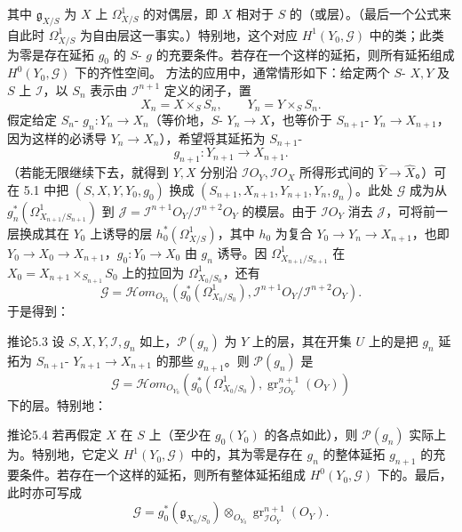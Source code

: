 其中 $\mathfrak g_{X/S}$ 为 $X$ 上 $\Omega^1_{X/S}$ 的对偶层，即 $X$ 相对于 $S$ 的（或层）。（最后一个公式来自此时 $\Omega^1_{X/S}$ 为自由层这一事实。）特别地，这个对应 $H^1(Y_0,\mathcal G)$ 中的类；此类为零是存在延拓 $g_0$ 的 $S$- $g$ 的充要条件。若存在一个这样的延拓，则所有延拓组成 $H^0(Y_0,\mathcal G)$ 下的齐性空间。
方法的应用中，通常情形如下：给定两个 $S$- $X,Y$ 及 $S$ 上 $\mathcal I$，以 $S_n$ 表示由 $\mathcal I^{n+1}$ 定义的闭子，置
\[X_n=X\times_S S_n,\qquad Y_n=Y\times_S S_n.\]
假定给定 $S_n$- $g_n:Y_n\to X_n$（等价地，$S$- $Y_n\to X$，也等价于 $S_{n+1}$- $Y_n\to X_{n+1}$，因为这样的必诱导 $Y_n\to X_n$），希望将其延拓为 $S_{n+1}$-
\[g_{n+1}:Y_{n+1}\to X_{n+1}.\]
（若能无限继续下去，就得到 $Y,X$ 分别沿 $\mathcal I O_Y,\mathcal I O_X$ 所得形式间的 $\widehat Y\to\widehat X$。）可在 5.1 中把 $(S,X,Y,Y_0,g_0)$ 换成 $(S_{n+1},X_{n+1},Y_{n+1},Y_n,g_n)$。此处 $\mathcal G$ 成为从 $g_n^*(\Omega^1_{X_{n+1}/S_{n+1}})$ 到 $\mathcal J=\mathcal I^{n+1}O_Y/\mathcal I^{n+2}O_Y$ 的模层。由于 $\mathcal I O_Y$ 消去 $\mathcal J$，可将前一层换成其在 $Y_0$ 上诱导的层 $h_0^*(\Omega^1_{X/S})$，其中 $h_0$ 为复合 $Y_0\to Y_n\to X_{n+1}$，也即 $Y_0\to X_0\to X_{n+1}$，$g_0:Y_0\to X_0$ 由 $g_n$ 诱导。因 $\Omega^1_{X_{n+1}/S_{n+1}}$ 在 $X_0=X_{n+1}\times_{S_{n+1}}S_0$ 上的拉回为 $\Omega^1_{X_0/S_0}$，还有
\[\mathcal G=\mathcal H\!om_{O_{Y_0}}(g_0^*(\Omega^1_{X_0/S_0}),\mathcal I^{n+1}O_Y/\mathcal I^{n+2}O_Y).\]
于是得到：
\begin{SGAresult}{推论}{5.3}
设 $S,X,Y,\mathcal I,g_n$ 如上，$\mathcal P(g_n)$ 为 $Y$ 上的层，其在开集 $U$ 上的是把 $g_n$ 延拓为 $S_{n+1}$- $Y_{n+1}\to X_{n+1}$ 的那些 $g_{n+1}$。则 $\mathcal P(g_n)$ 是
\[\mathcal G=\mathcal H\!om_{O_{Y_0}}(g_0^*(\Omega^1_{X_0/S_0}),\operatorname{gr}^{n+1}_{\mathcal I O_Y}(O_Y))\]
下的层。特别地：
\end{SGAresult}
\begin{SGAresult}{推论}{5.4}
若再假定 $X$ 在 $S$ 上（至少在 $g_0(Y_0)$ 的各点如此），则 $\mathcal P(g_n)$ 实际上为。特别地，它定义 $H^1(Y_0,\mathcal G)$ 中的，其为零是存在 $g_n$ 的整体延拓 $g_{n+1}$ 的充要条件。若存在一个这样的延拓，则所有整体延拓组成 $H^0(Y_0,\mathcal G)$ 下的。最后，此时亦可写成
\[\mathcal G=g_0^*(\mathfrak g_{X_0/S_0})\otimes_{O_{Y_0}}\operatorname{gr}^{n+1}_{\mathcal I O_Y}(O_Y).\]
\end{SGAresult}
